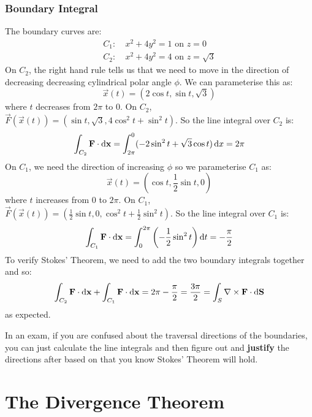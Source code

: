 \documentclass[../main.tex]{subfiles}
\begin{document}
\subsubsection{Boundary Integral}
The boundary curves are:
\begin{align*}
  C_1:&\ x^2 + 4y^2 = 1 \text{ on } z = 0 \\
  C_2:&\ x^2 + 4y^2 = 4 \text{ on } z = \sqrt{3}
\end{align*}
On $C_2$, the right hand rule tells us that we need to move in the direction of decreasing decreasing cylindrical polar angle $\phi$.
We can parameterise this as:
\[
  \vec{x}(t) = (2 \cos t, \sin t , \sqrt{3})
\]
where $t$ decreases from $2\pi$ to $0$.
On $C_2$, $\vec{F}(\vec{x}(t)) = (\sin t, \sqrt{3}, 4\cos^2 t + \sin^2 t)$.
So the line integral over $C_2$ is:
\[
  \int_{C_2} \vec{F} \cdot \d{\vec{x}} = \int_{2\pi}^{0} (-2\sin^2 t + \sqrt{3} \cos t) \d{x} = 2\pi
\]
On $C_1$, we need the direction of increasing $\phi$ so we parameterise $C_1$ as:
\[
  \vec{x}(t) = \left(\cos t, \frac{1}{2} \sin t, 0\right)
\]
where $t$ increases from $0$ to $2\pi$.
On $C_1$, $\vec{F}(\vec{x}(t)) = (\frac{1}{2} \sin t, 0, \cos^2 t + \frac{1}{2} \sin^2 t)$.
So the line integral over $C_1$ is:
\[
  \int_{C_1} \vec{F} \cdot \d{\vec{x}} = \int_{0}^{2\pi} \left(-\frac{1}{2}\sin^2 t\right) \d{t} = -\frac{\pi}{2}
\]
To verify Stokes' Theorem, we need to add the two boundary integrals together and so:
\[
  \int_{C_2} \vec{F} \cdot \d{\vec{x}} + \int_{C_1} \vec{F} \cdot \d{\vec{x}} = 2\pi - \frac{\pi}{2} = \frac{3\pi}{2} = \int_{S} \nabla \times \vec{F} \cdot \d{\vec{S}}
\]
as expected.
\begin{remark}[Advice]
  In an exam, if you are confused about the traversal directions of the boundaries, you can just calculate the line integrals and then figure out and \textbf{justify} the directions after based on that you know Stokes' Theorem will hold.
\end{remark}
\section{The Divergence Theorem}
\end{document}
